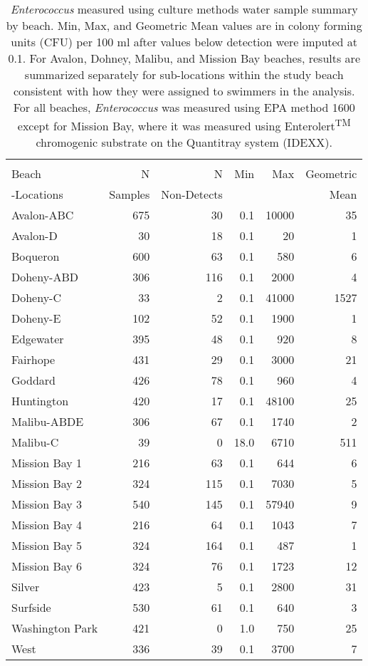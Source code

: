 \documentclass[12pt]{article}\usepackage[]{graphicx}\usepackage[]{color}
\begin{document}
\clearpage
\begin{table}[h!tb]
\begin{center}
\caption{\textit{Enterococcus} measured using culture methods water sample summary by beach. Min, Max, and Geometric Mean values are in colony forming units (CFU) per 100 ml after values below detection were imputed at 0.1. For Avalon, Dohney, Malibu, and Mission Bay beaches, results are summarized separately for sub-locations within the study beach consistent with how they were assigned to swimmers in the analysis. For all beaches, \textit{Enterococcus} was measured using EPA method 1600 except for Mission Bay, where it was measured using Enterolert\textsuperscript{\scriptsize{TM}} chromogenic substrate on the Quantitray system (IDEXX). \label{tab:wq1600}}
\begin{tabular}{l rrrrr}
 & \\
Beach              & N       & N           & Min & Max & Geometric  \\
-Locations & Samples & Non-Detects &     &     & Mean \\
\hline
 Avalon-ABC & 675 & 30 & 0.1 & 10000 & 35 \\ 
  Avalon-D & 30 & 18 & 0.1 & 20 & 1 \\ 
  Boqueron & 600 & 63 & 0.1 & 580 & 6 \\ 
  Doheny-ABD & 306 & 116 & 0.1 & 2000 & 4 \\ 
  Doheny-C & 33 & 2 & 0.1 & 41000 & 1527 \\ 
  Doheny-E & 102 & 52 & 0.1 & 1900 & 1 \\ 
  Edgewater & 395 & 48 & 0.1 & 920 & 8 \\ 
  Fairhope & 431 & 29 & 0.1 & 3000 & 21 \\ 
  Goddard & 426 & 78 & 0.1 & 960 & 4 \\ 
  Huntington & 420 & 17 & 0.1 & 48100 & 25 \\ 
  Malibu-ABDE & 306 & 67 & 0.1 & 1740 & 2 \\ 
  Malibu-C & 39 & 0 & 18.0 & 6710 & 511 \\ 
  Mission Bay 1 & 216 & 63 & 0.1 & 644 & 6 \\ 
  Mission Bay 2 & 324 & 115 & 0.1 & 7030 & 5 \\ 
  Mission Bay 3 & 540 & 145 & 0.1 & 57940 & 9 \\ 
  Mission Bay 4 & 216 & 64 & 0.1 & 1043 & 7 \\ 
  Mission Bay 5 & 324 & 164 & 0.1 & 487 & 1 \\ 
  Mission Bay 6 & 324 & 76 & 0.1 & 1723 & 12 \\ 
  Silver & 423 & 5 & 0.1 & 2800 & 31 \\ 
  Surfside & 530 & 61 & 0.1 & 640 & 3 \\ 
  Washington Park & 421 & 0 & 1.0 & 750 & 25 \\ 
  West & 336 & 39 & 0.1 & 3700 & 7 \\ 
  

\end{tabular}
\end{center}
\end{table}
\end{document}
